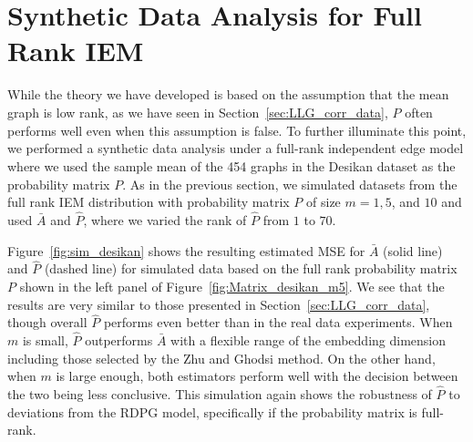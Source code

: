 %
%








\section{Synthetic Data Analysis for Full Rank IEM}
\label{sec:sim_iem}

While the theory we have developed is based on the assumption that the mean graph is low rank, as we have seen in Section~\ref{sec:LLG_corr_data}, $\hat{P}$ often performs well even when this assumption is false. 
To further illuminate this point, we performed a synthetic data analysis under a full-rank independent edge model where we used the sample mean of the 454 graphs in the Desikan dataset as the probability matrix $P$.
As in the previous section, we simulated datasets from the full rank IEM distribution with probability matrix $P$ of size $m=1,5$, and $10$ and used $\bar{A}$ and $\hat{P}$, where we varied the rank of $\hat{P}$ from $1$ to $70$.

Figure~\ref{fig:sim_desikan} shows the resulting estimated MSE for $\bar{A}$ (solid line) and $\hat{P}$ (dashed line) for simulated data based on the full rank probability matrix $P$ shown in the left panel of Figure~\ref{fig:Matrix_desikan_m5}.
We see that the results are very similar to those presented in Section~\ref{sec:LLG_corr_data}, though overall $\hat{P}$ performs even better than in the real data experiments. 
When $m$ is small, $\hat{P}$ outperforms $\bar{A}$ with a flexible range of the embedding dimension including those selected by the Zhu and Ghodsi method.
On the other hand, when $m$ is large enough, both estimators perform well with the decision between the two being less conclusive.
This simulation again shows the robustness of $\hat{P}$ to deviations from the RDPG model, specifically if the probability matrix is full-rank.

